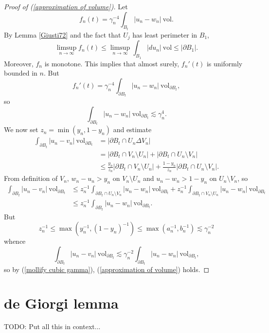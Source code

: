\documentclass[reqno,12pt,letterpaper]{amsart}
\newcommand{\vol}{\mathrm{vol}}
\theoremstyle{definition}
\numberwithin{equation}{section}
\begin{document}
\begin{proof}[Proof of (\ref{approximation of volume})]
Let
$$f_n(t) = \gamma_n^{-4} \int_{B_t} |u_n - w_n| ~\vol.$$
By Lemma \ref{Giusti72} and the fact that $U_j$ has least perimeter in $B_1$,
$$\limsup_{n \to \infty} f_n(t) \leq \limsup_{n \to \infty} \int_{B_1} |du_n| ~\vol \leq |\partial B_1|.$$
Moreover, $f_n$ is monotone.
This implies that almost surely, $f_n'(t)$ is uniformly bounded in $n$.
But
$$f_n'(t) = \gamma_n^{-4} \int_{\partial B_t} |u_n - w_n| ~\vol_{\partial B_t},$$
so
\begin{equation}\label{mollify cubic gamma}
\int_{\partial B_t} |u_n - w_n| ~\vol_{\partial B_t} \lesssim \gamma_n^4.
\end{equation}
We now set $z_n = \min(y_n, 1 - y_n)$ and estimate
\begin{align*}
\int_{\partial B_t} |u_n - v_n| ~\vol_{\partial B_t} &= |\partial B_t \cap U_n \Delta V_n| \\
&= |\partial B_t \cap V_n \setminus U_n| + |\partial B_t \cap U_n \setminus V_n| \\
&\leq \frac{y_n}{z_n} |\partial B_t \cap V_n \setminus U_n| + \frac{1 - y_n}{z_n} |\partial B_t \cap U_n \setminus V_n|.
\end{align*}
From definition of $V_n$, $w_n - u_n > y_n$ on $V_n \setminus U_n$ and $u_n - w_n > 1 - y_n$ on $U_n \setminus V_n$, so
\begin{align*}
\int_{\partial B_t} |u_n - v_n| ~\vol_{\partial B_t} &\leq z_n^{-1} \int_{\partial B_t \cap U_n \setminus V_n} |u_n - w_n| ~\vol_{\partial B_t} + z_n^{-1}\int_{\partial B_t \cap V_n \setminus U_n} |u_n - w_n| ~\vol_{\partial B_t} \\
&\leq z_n^{-1} \int_{\partial B_t} |u_n - w_n| ~\vol_{\partial B_t}.
\end{align*}
But
$$z_n^{-1} \leq \max(y_n^{-1}, (1 - y_n)^{-1}) \leq \max(a_n^{-1}, b_n^{-1}) \lesssim \gamma_n^{-2}$$
whence
$$\int_{\partial B_t} |u_n - v_n| ~\vol_{\partial B_t} \lesssim \gamma_n^{-2} \int_{\partial B_t} |u_n - w_n| ~\vol_{\partial B_t},$$
so by (\ref{mollify cubic gamma}), (\ref{approximation of volume}) holds.
\end{proof}





\section{de Giorgi lemma}\label{DeGiorgiSection}
TODO: Put all this in context...
\end{document}
